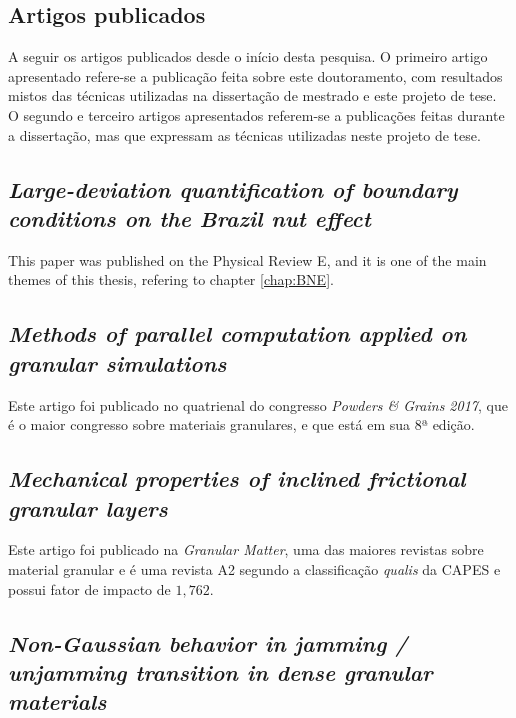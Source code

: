 \begin{apendicesenv}
\partapendices

\chapter{Artigos publicados}
\label{chap:Artigo}
    A seguir os artigos publicados desde o início desta pesquisa. O primeiro artigo apresentado refere-se a publicação feita sobre este doutoramento, com resultados mistos das técnicas utilizadas na dissertação de mestrado \cite{Dissertacao} e este projeto de tese. O segundo e terceiro artigos apresentados referem-se a publicações feitas durante a dissertação, mas que expressam as técnicas utilizadas neste projeto de tese.

\section{\textit{Large-deviation quantification of boundary conditions on the Brazil nut effect}}

    This paper was published on the Physical Review E, and it is one of the main themes of this thesis, refering to chapter \ref{chap:BNE}.

\section{\textit{Methods of parallel computation applied on granular simulations}}

    Este artigo foi publicado no quatrienal do congresso \textit{Powders \& Grains 2017}, que é o maior congresso sobre materiais granulares, e que está em sua 8ª edição.



\section{\textit{Mechanical properties of inclined frictional granular layers}}

    Este artigo foi publicado na \textit{Granular Matter}, uma das maiores revistas sobre material granular e é uma revista A2 segundo a classificação \textit{qualis} da CAPES e possui fator de impacto de $1,762$.



\section{\textit{Non-Gaussian behavior in jamming / unjamming transition in dense granular materials}}


\end{apendicesenv}
